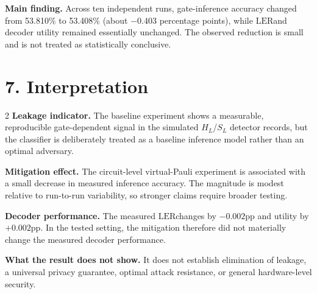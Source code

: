 \documentclass[9pt,a4paper]{article}
\newcommand{\HL}{\ensuremath{H_L}}
\newcommand{\SL}{\ensuremath{S_L}}
\newcommand{\LER}{\ensuremath{\mathrm{LER}}}
\newcommand{\pp}{\ensuremath{\mathrm{pp}}}
\begin{document}
\begin{center}
\end{center}

\begin{boxm}
\textbf{Main finding.} Across ten independent runs, gate-inference accuracy changed from 53.810\% to 53.408\% (about $-0.403$ percentage points), while \LER and decoder utility remained essentially unchanged. The observed reduction is small and is not treated as statistically conclusive.
\end{boxm}

\section*{7. Interpretation}
\begin{multicols}{2}
\textbf{Leakage indicator.} The baseline experiment shows a measurable, reproducible gate-dependent signal in the simulated \HL/\SL{} detector records, but the classifier is deliberately treated as a baseline inference model rather than an optimal adversary.

\textbf{Mitigation effect.} The circuit-level virtual-Pauli experiment is associated with a small decrease in measured inference accuracy. The magnitude is modest relative to run-to-run variability, so stronger claims require broader testing.

\columnbreak

\textbf{Decoder performance.} The measured \LER changes by $-0.002\pp$ and utility by $+0.002\pp$. In the tested setting, the mitigation therefore did not materially change the measured decoder performance.

\textbf{What the result does not show.} It does not establish elimination of leakage, a universal privacy guarantee, optimal attack resistance, or general hardware-level security.
\end{multicols}
\end{document}
